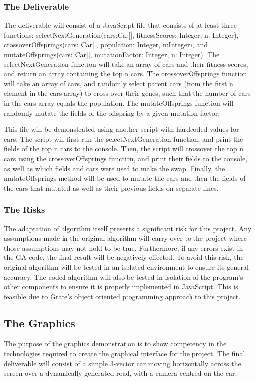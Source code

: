 \documentclass{article}
\begin{document}
\subsubsection{The Deliverable}
The deliverable will consist of a JavaScript file that consists of at least 
three functions: selectNextGeneration(cars:Car[], fitnessScores: Integer, n: 
Integer), crossoverOffsprings(cars: Car[], population: Integer, n:Integer), and 
mutateOffsprings(cars: Car[], mutationFactor: Integer, n: Integer). The 
selectNextGeneration function will take an array of cars and their fitness 
scores, and return an array containing the top n cars. The crossoverOffsprings 
function will take an array of cars, and randomly select parent cars (from the 
first n element in the cars array) to cross over their genes, such that the 
number of cars in the cars array equals the population. The mutateOffsprings 
function will randomly mutate the fields of the offspring by a given mutation 
factor.

This file will be demonstrated using another script with hardcoded values for 
cars. The script will first run the selectNextGeneration function, and print the 
fields of the top n cars to the console. Then, the script will crossover the top 
n cars using the crossoverOffsprings function, and print their fields to the 
console, as well as which fields and cars were used to make the swap. Finally, 
the mutateOffsprings method will be used to mutate the cars and then the fields 
of the cars that mutated as well as their previous fields on separate lines.

\subsubsection{The Risks}
The adaptation of algorithm itself presents a significant risk for this project. 
Any assumptions made in the original algorithm will carry over to the project 
where those assumptions may not hold to be true.  \textcolor{RoyalPurple}{Furthermore}, if any errors 
exist in the GA code, the final result will be negatively effected. To avoid 
this risk, the original algorithm will be tested in an isolated \textcolor{RoyalPurple}{environment} to 
ensure its general accuracy. The coded algorithm will also be tested in 
isolation of the program's other components to ensure it is properly implemented 
in JavaScript. This is feasible due to \textcolor{RoyalPurple}{Grate's} object oriented programming 
approach to this project.

\subsection{The Graphics}
The purpose of the graphics demonstration is to show competency in the 
technologies required to create the graphical interface for the project. The 
final deliverable will consist of a simple 3-vector car moving horizontally 
across the screen over a dynamically generated road, with a camera centred on 
the car.
\end{document}
